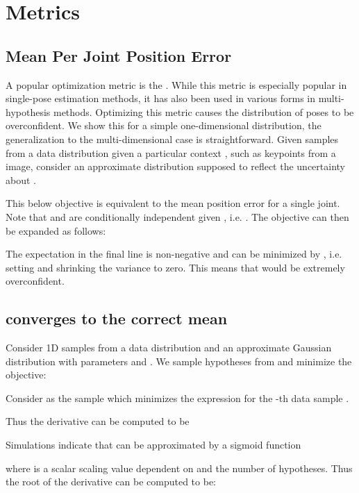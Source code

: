 \documentclass{article} \usepackage{iclr2023_conference,times}
\begin{document}



\appendix
\renewcommand{\figurename}{Supplementary Figure}
\renewcommand{\tablename}{Supplementary Table}
\section{Metrics}
\subsection{Mean Per Joint Position Error}
\label{app_seq:mpjpe}
A popular optimization metric is the .
While this metric is especially popular in single-pose estimation methods, it has also been used in various forms in multi-hypothesis methods.
Optimizing this metric causes the distribution of poses to be overconfident.
We show this for a simple one-dimensional distribution, the generalization to the multi-dimensional case is straightforward. 
Given samples  from a data distribution given a particular context , such as keypoints from a image,  consider an approximate distribution  supposed to reflect the uncertainty about . 

This below objective is equivalent to the mean position error for a single joint. Note that  and  are conditionally independent given , i.e. . The objective can then be expanded as follows:

The expectation in the final line is non-negative and can be minimized by , i.e. setting  and shrinking the variance to zero. This means that  would be extremely overconfident. 

\subsection{ converges to the correct mean}
\label{app_sec:mpjpe_mean}
Consider 1D samples  from a data distribution  and an approximate Gaussian distribution  with parameters  and .
We sample  hypotheses from  and minimize the  objective:

Consider  as the  sample which minimizes the expression for the -th data sample .

Thus the derivative can be computed to be

Simulations indicate that  can be approximated by a sigmoid function

where  is a scalar scaling value dependent on  and the number of hypotheses.
Thus the root of the derivative can be computed to be:
\end{document}
